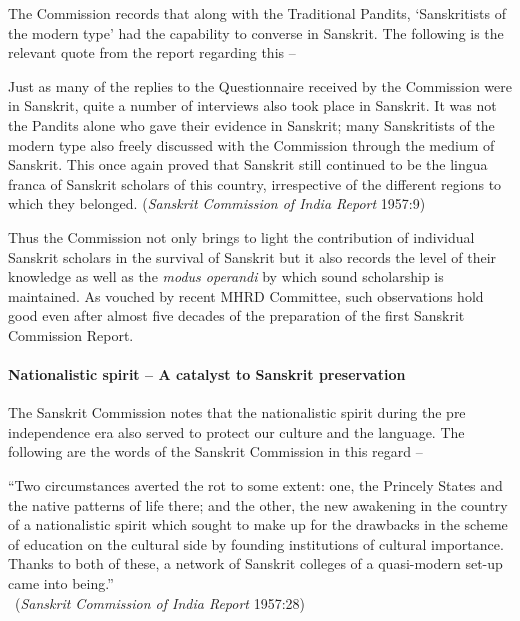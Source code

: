 The Commission records that along with the Traditional Pandits, ‘Sanskritists of the modern type’ had the capability to converse in Sanskrit. The following is the relevant quote from the report regarding this – 
\begin{myquote}
\eleven
 Just as many of the replies to the Questionnaire received by the Commission were in Sanskrit, quite a number of interviews also took place in Sanskrit. It was not the Pandits alone who gave their evidence in Sanskrit; many Sanskritists of the modern type also freely discussed with the Commission through the medium of Sanskrit. This once again proved that Sanskrit still continued to be the lingua franca of Sanskrit scholars of this country, irrespective of the different regions to which they belonged. \hfill({\sl Sanskrit Commission of India Report} 1957:9)
\end{myquote}

Thus the Commission not only brings to light the contribution of individual Sanskrit scholars in the survival of Sanskrit but it also records the level of their knowledge as well as the {\sl modus operandi} by which sound scholarship is maintained. As vouched by recent MHRD Committee, such observations hold good even after almost five decades of the preparation of the first Sanskrit Commission Report.  

\paragraph{Nationalistic spirit – A catalyst to Sanskrit preservation}

The Sanskrit Commission notes that the nationalistic spirit during the pre independence era also served to protect our culture and the language. The following are the words of the Sanskrit Commission in this regard  – 
\begin{myquote}
\eleven
“Two circumstances averted the rot to some extent: one, the Princely States and the native patterns of life there; and the other, the new awakening in the country of a nationalistic spirit which sought to make up for the drawbacks in the scheme of education on the cultural side by founding institutions of cultural importance. Thanks to both of these, a network of Sanskrit colleges of a quasi-modern set-up came into being.”\\[-15pt] 

~\hfill({\sl Sanskrit Commission of India Report} 1957:28)
\end{myquote}

